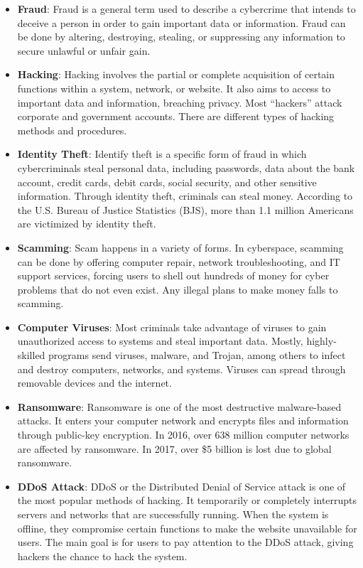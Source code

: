 \documentclass [12pt, a4paper]{article}
\begin{document}
\begin{itemize}
	\item \textbf{Fraud}: Fraud is a general term used to describe a cybercrime that intends to deceive a person in order to gain important data or information. Fraud can be done by altering, destroying, stealing, or suppressing any information to secure unlawful or unfair gain.
	\item \textbf{Hacking}: Hacking involves the partial or complete acquisition of certain functions within a system, network, or website. It also aims to access to important data and information, breaching privacy. Most “hackers” attack corporate and government accounts. There are different types of hacking methods and procedures.
	\item \textbf{Identity Theft}: Identify theft is a specific form of fraud in which cybercriminals steal personal data, including passwords, data about the bank account, credit cards, debit cards, social security, and other sensitive information. Through identity theft, criminals can steal money. According to the U.S. Bureau of Justice Statistics (BJS), more than 1.1 million Americans are victimized by identity theft.
	\item \textbf{Scamming}: Scam happens in a variety of forms. In cyberspace, scamming can be done by offering computer repair, network troubleshooting, and IT support services, forcing users to shell out hundreds of money for cyber problems that do not even exist. Any illegal plans to make money falls to scamming.
	\item \textbf{Computer Viruses}: Most criminals take advantage of viruses to gain unauthorized access to systems and steal important data. Mostly, highly-skilled programs send viruses, malware, and Trojan, among others to infect and destroy computers, networks, and systems. Viruses can spread through removable devices and the internet.
	\item \textbf{Ransomware}: Ransomware is one of the most destructive malware-based attacks. It enters your computer network and encrypts files and information through public-key encryption. In 2016, over 638 million computer networks are affected by ransomware. In 2017, over \$5 billion is lost due to global ransomware.
	\item \textbf{DDoS Attack}: DDoS or the Distributed Denial of Service attack is one of the most popular methods of hacking. It temporarily or completely interrupts servers and networks that are successfully running. When the system is offline, they compromise certain functions to make the website unavailable for users. The main goal is for users to pay attention to the DDoS attack, giving hackers the chance to hack the system.

\end{itemize}
\end{document}

